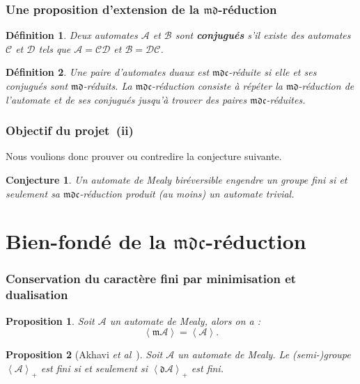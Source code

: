 \documentclass[11pt]{beamer}
\newtheorem{prop}{Proposition}
\newtheorem{defi}{Définition}
\newtheorem{conj}{Conjecture}
\begin{document}
\begin{frame}
  \frametitle{Une proposition d'extension de la $\mathfrak{md}$-réduction}

  \begin{defi}
    Deux automates $\mathcal{A}$ et $\mathcal{B}$ sont \textbf{\textit{conjugués}} s'il existe des automates~$\mathcal{C}$ et $\mathcal{D}$ tels que $\mathcal{A}=\mathcal{CD}$ et $\mathcal{B}=\mathcal{DC}$.
  \end{defi}

  \begin{defi}
    Une paire d'automates duaux est $\mathfrak{mdc}$-réduite si elle et ses conjugués sont $\mathfrak{md}$-réduits.
    La $\mathfrak{mdc}$-réduction consiste à répéter la $\mathfrak{md}$-réduction de l'automate et de ses conjugués jusqu'à trouver des paires $\mathfrak{mdc}$-réduites.
  \end{defi}

\end{frame}

\begin{frame}
  \frametitle{Objectif du projet~(ii)}

  Nous voulions donc prouver ou contredire la conjecture suivante.

  \begin{conj}
    Un automate de Mealy biréversible engendre un groupe fini si et seulement sa $\mathfrak{mdc}$-réduction produit (au moins) un automate trivial.
  \end{conj}

\end{frame}

\section{Bien-fondé de la $\mathfrak{mdc}$-réduction}

\begin{frame}
  \frametitle{Conservation du caractère fini par minimisation et dualisation}
  \begin{prop}
    Soit $\mathcal{A}$ un automate de Mealy, alors on a :
    \[ \left<\mathfrak{m}\mathcal{A}\right> = \left<\mathcal{A}\right>. \]
  \end{prop}

  \begin{prop}[Akhavi \emph{et al}~\cite{DBLP:journals/corr/abs-1105-4725}]
    Soit $\mathcal{A}$ un automate de Mealy. Le (semi-)groupe $\left<\mathcal{A}\right>_+$ est fini si et seulement si $\left<\mathfrak{d}\mathcal{A}\right>_+$ est fini.
  \end{prop}
\end{frame}
\end{document}
